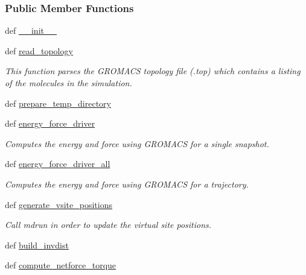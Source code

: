 \subsubsection*{Public Member Functions}
\begin{DoxyCompactItemize}
\item 
def \hyperlink{classforcebalance_1_1gmxio_1_1AbInitio__GMX_a1d03ae8104bcecacf96884058f2698af}{\-\_\-\-\_\-init\-\_\-\-\_\-}
\item 
def \hyperlink{classforcebalance_1_1gmxio_1_1AbInitio__GMX_aba138ca4195a1737f2f00bd8c5f3ca07}{read\-\_\-topology}
\begin{DoxyCompactList}\small\item\em This function parses the G\-R\-O\-M\-A\-C\-S topology file (.top) which contains a listing of the molecules in the simulation. \end{DoxyCompactList}\item 
def \hyperlink{classforcebalance_1_1gmxio_1_1AbInitio__GMX_ab2eac76585bdb8401812f0c8e465a44e}{prepare\-\_\-temp\-\_\-directory}
\item 
def \hyperlink{classforcebalance_1_1gmxio_1_1AbInitio__GMX_a4bc31d1c02d47749d26b14779f025ebd}{energy\-\_\-force\-\_\-driver}
\begin{DoxyCompactList}\small\item\em Computes the energy and force using G\-R\-O\-M\-A\-C\-S for a single snapshot. \end{DoxyCompactList}\item 
def \hyperlink{classforcebalance_1_1gmxio_1_1AbInitio__GMX_a6e43c323b2286c546ff8afd3377f8808}{energy\-\_\-force\-\_\-driver\-\_\-all}
\begin{DoxyCompactList}\small\item\em Computes the energy and force using G\-R\-O\-M\-A\-C\-S for a trajectory. \end{DoxyCompactList}\item 
def \hyperlink{classforcebalance_1_1gmxio_1_1AbInitio__GMX_ae17e3c379d82935d725dd31f01df23e5}{generate\-\_\-vsite\-\_\-positions}
\begin{DoxyCompactList}\small\item\em Call mdrun in order to update the virtual site positions. \end{DoxyCompactList}\item 
def \hyperlink{classforcebalance_1_1abinitio_1_1AbInitio_a7475857193eefd4edd020d4f2a8fec17}{build\-\_\-invdist}
\item 
def \hyperlink{classforcebalance_1_1abinitio_1_1AbInitio_afbf86c26158a68cae7460b4106809fdd}{compute\-\_\-netforce\-\_\-torque}

\end{DoxyCompactItemize}
